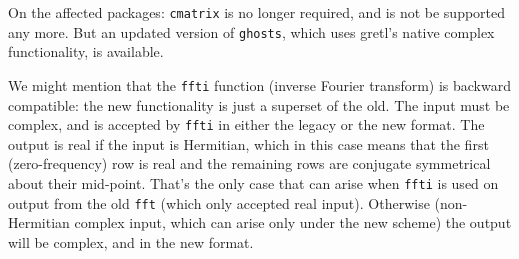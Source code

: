 On the affected packages: \texttt{cmatrix} is no longer required, and
is not be supported any more. But an updated version of
\texttt{ghosts}, which uses gretl's native complex functionality, is
available.

We might mention that the \texttt{ffti} function (inverse Fourier
transform) is backward compatible: the new functionality is just a
superset of the old. The input must be complex, and is accepted by
\texttt{ffti} in either the legacy or the new format. The output is
real if the input is Hermitian, which in this case means that the
first (zero-frequency) row is real and the remaining rows are
conjugate symmetrical about their mid-point. That's the only case that
can arise when \texttt{ffti} is used on output from the old
\texttt{fft} (which only accepted real input).  Otherwise
(non-Hermitian complex input, which can arise only under the new
scheme) the output will be complex, and in the new format.

